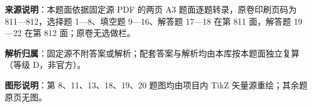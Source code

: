
\begin{gknotice}
\textbf{来源说明}：本题面依据固定源 PDF 的两页 A3 题面逐题转录，原卷印刷页码为 811—812，选择题 1—8、填空题 9—16、解答题 17—18 在第 811 面，解答题 19—22 在第 812 面；原卷无选做栏。

\textbf{解析归属}：固定源不附答案或解析；配套答案与解析均由本库按本题面独立复算（等级 D，非官方）。

\textbf{图形说明}：第 8、11、13、18、19、20 题图均由项目内 TikZ 矢量源重绘；其余题原页无图。
\end{gknotice}


